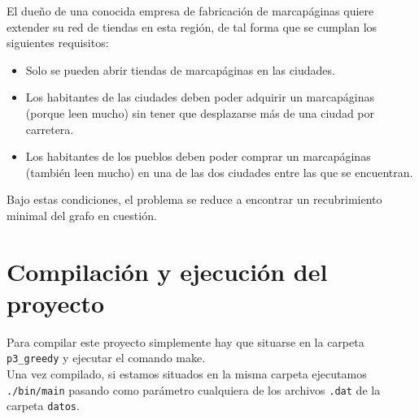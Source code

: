 \documentclass[11pt]{article}
\begin{document}
El dueño de una conocida empresa de fabricación de marcapáginas quiere extender su red de tiendas en esta región, de tal forma que se cumplan los siguientes requisitos:

\begin{itemize}
    \item Solo se pueden abrir tiendas de marcapáginas en las ciudades.
	\item Los habitantes de las ciudades deben poder adquirir un marcapáginas (porque leen mucho) sin tener que desplazarse más de una ciudad por carretera.
	 \item Los habitantes de los pueblos deben poder comprar un marcapáginas (también leen mucho) en una de las dos ciudades entre las que se encuentran.
\end{itemize}

Bajo estas condiciones, el problema se reduce a encontrar un recubrimiento minimal del grafo en cuestión.

\section*{Compilación y ejecución del proyecto}
Para compilar este proyecto simplemente hay que situarse en la carpeta \verb|p3_greedy| y ejecutar el comando make.\\

Una vez compilado, si estamos situados en la misma carpeta ejecutamos \verb|./bin/main| pasando como parámetro cualquiera de los archivos \verb|.dat| de la carpeta \verb|datos|.
\end{document}
